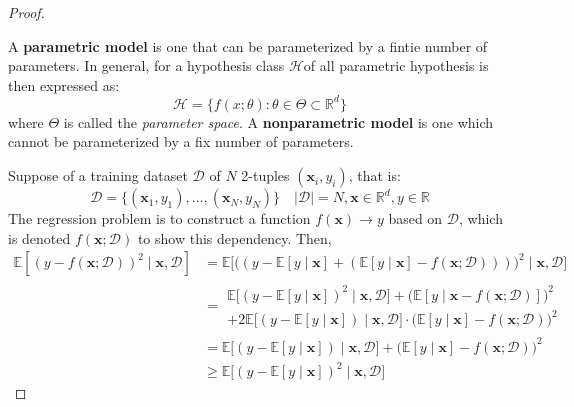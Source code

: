 \documentclass{article}
\begin{document}
\begin{proof}
    \begin{definition}[Parameterization]
        A \textbf{parametric model} is one that can be parameterized by a fintie number of parameters. In general, for a hypothesis class $\mathcal{H}$of all parametric hypothesis is then expressed as:
        \begin{equation}
            \mathcal{H} = \{f(x;\theta): \theta \in \Theta \subset \mathbb{R}^{d}\}
        \end{equation} where $\Theta$ is called the \textit{parameter space}. A \textbf{nonparametric model} is one which cannot be parameterized by a fix number of parameters.   
    \end{definition}
    Suppose of a training dataset $\mathcal{D}$ of $N$ 2-tuples $(\mathbf{x}_{i},y_{i})$, that is: \begin{equation}
        \mathcal{D} = \{(\mathbf{x}_{1},y_{1}),\dots,(\mathbf{x}_{N},y_{N})\} \quad \lvert \mathcal{D} \rvert = N, \mathbf{x}\in \mathbb{R}^{d}, y \in \mathbb{R}
    \end{equation}
    The regression problem is to construct a function $f(\mathbf{x})\to y$ based on $\mathcal{D}$, which is denoted $f(\mathbf{x};\mathcal{D})$ to show this dependency. Then, 
    \begin{equation}
        \begin{split}
            \mathbb{E}\left[ (y-f(\mathbf{x};\mathcal{D}))^{2}\mid \mathbf{x},\mathcal{D}\right] & = \mathbb{E}\Big[\big( (y-\mathbb{E}[y\mid \mathbf{x}]+ (\mathbb{E}[y\mid \mathbf{x}]-f(\mathbf{x};\mathcal{D}))) \big)^{2}\mid \mathbf{x},\mathcal{D}\Big]\\
            & = \begin{multlined}
                \mathbb{E} \Big[ (y- \mathbb{E}[y\mid \mathbf{x}])^{2}\mid \mathbf{x},\mathcal{D} \Big] + \Big(\mathbb{E}[y\mid \mathbf{x}-f(\mathbf{x};\mathcal{D})]\Big)^{2} \\ + 2\mathbb{E} \big[(y-\mathbb{E}[y\mid \mathbf{x}])\mid \mathbf{x},\mathcal{D}\big]\cdot \big(\mathbb{E}[y\mid \mathbf{x}]-f(\mathbf{x;\mathcal{D}})\big)^{2} 
            \end{multlined} \\
            & = \mathbb{E} \Big[(y-\mathbb{E}[y\mid \mathbf{x}])\mid \mathbf{x},\mathcal{D}\Big] + \big(\mathbb{E}[y\mid \mathbf{x}]-f(\mathbf{x};\mathcal{D})\big)^{2}\\
            & \geq \mathbb{E} \big[(y-\mathbb{E}[y\mid \mathbf{x}])^{2}\mid \mathbf{x},\mathcal{D}\big]
        \end{split}

\end{equation}
\end{proof}
\end{document}
